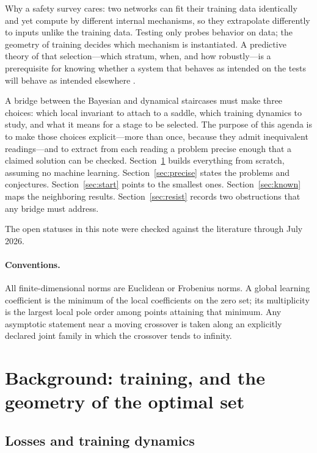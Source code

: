 \documentclass[11pt]{amsart}
\theoremstyle{plain}
\theoremstyle{definition}
\begin{document}
Why a safety survey cares: two networks can fit their training data identically and yet compute by different internal mechanisms, so they extrapolate differently to inputs unlike the training data. Testing only probes behavior on data; the geometry of training decides which mechanism is instantiated. A predictive theory of that selection---which stratum, when, and how robustly---is a prerequisite for knowing whether a system that behaves as intended on the tests will behave as intended elsewhere \cite{lehalleur2025}.

A bridge between the Bayesian and dynamical staircases must make three choices: which local invariant to attach to a saddle, which training dynamics to study, and what it means for a stage to be selected. The purpose of this agenda is to make those choices explicit---more than once, because they admit inequivalent readings---and to extract from each reading a problem precise enough that a claimed solution can be checked. Section~\ref{sec:background} builds everything from scratch, assuming no machine learning. Section~\ref{sec:precise} states the problems and conjectures. Section~\ref{sec:start} points to the smallest ones. Section~\ref{sec:known} maps the neighboring results. Section~\ref{sec:resist} records two obstructions that any bridge must address.

The open statuses in this note were checked against the literature through July 2026.

\paragraph{Conventions.}
All finite-dimensional norms are Euclidean or Frobenius norms. A global learning coefficient is the minimum of the local coefficients on the zero set; its multiplicity is the largest local pole order among points attaining that minimum. Any asymptotic statement near a moving crossover is taken along an explicitly declared joint family in which the crossover tends to infinity.

\section{Background: training, and the geometry of the optimal set}\label{sec:background}

\subsection{Losses and training dynamics}\label{sec:losses}
\end{document}
